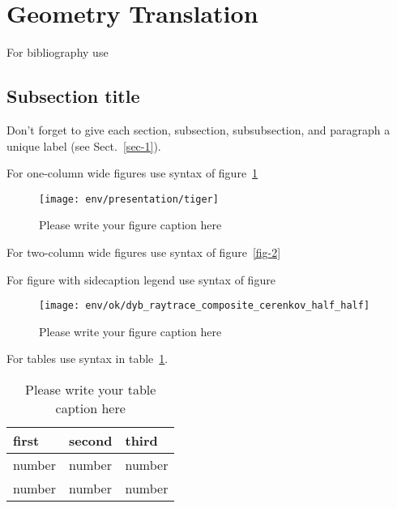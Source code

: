 
\section{Geometry Translation}
\label{geometry}
For bibliography use \cite{RefJ}
\subsection{Subsection title}
\label{sec-2}
Don't forget to give each section, subsection, subsubsection, and
paragraph a unique label (see Sect.~\ref{sec-1}).

For one-column wide figures use syntax of figure~\ref{fig-1}
\begin{figure}[h]
\centering
\texttt{[image: env/presentation/tiger]}
\caption{Please write your figure caption here}
\label{fig-1}       %
\end{figure}

For two-column wide figures use syntax of figure~\ref{fig-2}
\begin{figure*}
\centering
\vspace*{5cm}       %
\caption{Please write your figure caption here}
\label{fig-2}       %
\end{figure*}

For figure with sidecaption legend use syntax of figure
\begin{figure}
\centering
\sidecaption
\texttt{[image: env/ok/dyb\_raytrace\_composite\_cerenkov\_half\_half]}
\caption{Please write your figure caption here}
\label{fig-3}       %
\end{figure}

For tables use syntax in table~\ref{tab-1}.
\begin{table}
\centering
\caption{Please write your table caption here}
\label{tab-1}       %
\begin{tabular}{lll}
\hline
first & second & third  \\\hline
number & number & number \\
number & number & number \\\hline
\end{tabular}
\vspace*{5cm}  %
\end{table}
%
%
